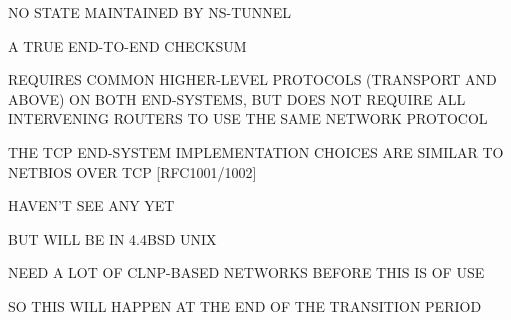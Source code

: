 



\begin{bwslide}

\begin{nrtc}
\item	NO STATE MAINTAINED BY NS-TUNNEL

\item	A TRUE END-TO-END CHECKSUM
\end{nrtc}
\end{bwslide}


\begin{bwslide}

\begin{nrtc}
\item	REQUIRES COMMON HIGHER-LEVEL PROTOCOLS (TRANSPORT AND ABOVE) ON BOTH
	END-SYSTEMS, BUT DOES NOT REQUIRE ALL INTERVENING ROUTERS TO USE THE
	SAME NETWORK PROTOCOL

\item	THE TCP END-SYSTEM IMPLEMENTATION CHOICES ARE SIMILAR TO NETBIOS OVER
	TCP [RFC1001/1002]
\end{nrtc}
\end{bwslide}


\begin{bwslide}

\begin{nrtc}
\item	HAVEN'T SEE ANY YET
    \begin{nrtc}
    \item	BUT WILL BE IN 4.4BSD UNIX
    \end{nrtc}

\item	NEED A LOT OF CLNP-BASED NETWORKS BEFORE THIS IS OF USE

\item	SO THIS WILL HAPPEN AT THE END OF THE TRANSITION PERIOD
\end{nrtc}
\end{bwslide}


